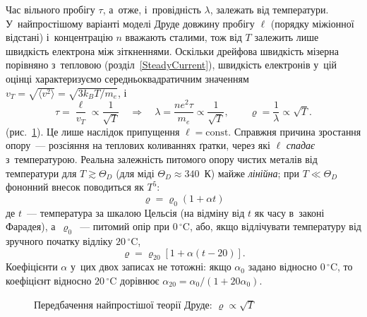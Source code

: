 Час вільного пробігу $\tau$, а~отже, і~провідність $\lambda$, залежать від температури.
У~найпростішому варіанті моделі Друде довжину пробігу $\ell$ (порядку міжіонної відстані)
і~концентрацію $n$ вважають сталими, тож від $T$ залежить лише швидкість електрона між
зіткненнями. Оскільки дрейфова швидкість мізерна порівняно з~тепловою
(розділ~\ref{SteadyCurrent}), швидкість електронів у~цій оцінці характеризуємо середньоквадратичним значенням
$v_T=\sqrt{\langle v^2\rangle}=\sqrt{3k_BT/m_e}$, і
\begin{equation*}
	\tau=\frac{\ell}{v_T}\propto\frac1{\sqrt T}\quad\Rightarrow\quad
	\lambda=\frac{ne^2\tau}{m_e}\propto\frac1{\sqrt T},\qquad
	\varrho=\frac1\lambda\propto\sqrt T.
\end{equation*}
(рис.~\ref{pic:DrudeRho}). Це лише наслідок припущення $\ell=\text{const}$. Справжня причина
зростання опору~--- розсіяння на теплових коливаннях ґратки, через які $\ell$ \emph{спадає}
з~температурою. Реальна залежність питомого опору чистих металів від температури для
$T\gtrsim\Theta_D$ (для міді $\Theta_D\approx340$~К) майже \emph{лінійна}; при
$T\ll\Theta_D$ фононний внесок поводиться як $T^5$:
\begin{equation}\label{eq:TempDependence1}
	\varrho = \varrho_0\left(1 + \alpha t\right)
\end{equation}
де $t$~--- температура за шкалою Цельсія (на відміну від $t$ як часу в~законі Фарадея),
а~$\varrho_0$~--- питомий опір при $0\,^\circ$C,
або, якщо відлічувати температуру від зручного початку відліку $20\,^\circ$C,
\begin{equation}\label{eq:TempDependence2}
	\varrho = \varrho_{20}\left[1 + \alpha(t - 20)\right].
\end{equation}
Коефіцієнти $\alpha$ у~цих двох записах не тотожні: якщо $\alpha_0$ задано відносно
$0\,^\circ$C, то коефіцієнт відносно $20\,^\circ$C дорівнює
$\alpha_{20}=\alpha_0/(1+20\alpha_0)$.

\begin{figure}
	\centering
	\centering
	\caption{Передбачення найпростішої теорії Друде: $\varrho\propto\sqrt T$}
	\label{pic:DrudeRho}
\end{figure}

